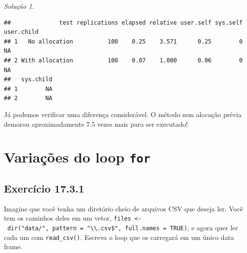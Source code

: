\documentclass[
]{latex/krantz}
\theoremstyle{definition}
\theoremstyle{definition}
\theoremstyle{definition}
\theoremstyle{definition}
\theoremstyle{remark}
\newtheorem*{solution}{Solução}
\begin{document}
\begin{solution}
\begin{verbatim}
##              test replications elapsed relative user.self sys.self user.child
## 1   No allocation          100    0.25    3.571      0.25        0         NA
## 2 With allocation          100    0.07    1.000      0.06        0         NA
##   sys.child
## 1        NA
## 2        NA
\end{verbatim}

Já podemos verificar uma diferença considerável. O método sem alocação prévia demorou aproximadamente 7.5 vezes mais para ser executado!
\end{solution}

\hypertarget{variauxe7uxf5es-do-loop-for}{%
\section{\texorpdfstring{Variações do loop \texttt{for}}{Variações do loop for}}\label{variauxe7uxf5es-do-loop-for}}

\hypertarget{exr17-3-1}{%
\subsection*{Exercício 17.3.1}\label{exr17-3-1}}

Imagine que você tenha um diretório cheio de arquivos CSV que deseja ler. Você tem os caminhos deles em um vetor, \texttt{files\ \textless{}-\ dir("data/",\ pattern\ =\ "\textbackslash{}\textbackslash{}.csv\$",\ full.names\ =\ TRUE)}, e agora quer ler cada um com \texttt{read\_csv()}. Escreva o loop que os carregará em um único data frame.
\end{document}

